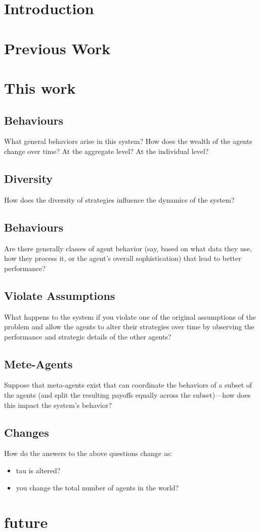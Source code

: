 \documentclass[]{article}
\title{}
\author{}
\begin{document}
\maketitle

\begin{abstract}

\end{abstract}

\section{Introduction}
\cite{Challenge}
\section{Previous Work}
\cite{RePEc:aea:aecrev:v:84:y:1994:i:2:p:406-11}
\cite{PAISE2007}
\cite{PAISE2009}
\section{This work}
\cite{Github}
\subsection{Behaviours}What general behaviors arise in this system?  How does the wealth of the agents change over time? At the aggregate level? At the individual level?
\subsection{Diversity}How does the diversity of strategies influence the dynamics of the system?
\subsection{Behaviours}Are there generally classes of agent behavior (say, based on what data they use, how they process it, or the agent's overall sophistication) that lead to better performance?
\subsection{Violate Assumptions}What happens to the system if you violate one of the original assumptions of the problem and allow the agents to alter their strategies over time by observing the performance and strategic details of the other agents?
\subsection{Mete-Agents}Suppose that meta-agents exist that can coordinate the behaviors of a subset of the agents (and split the resulting payoffs equally across the subset)---how does this impact the system's behavior?
\subsection{Changes}How do the answers to the above questions change as:
\begin{itemize}
	\item tau is altered?
	\item you change the total number of agents in the world?
\end{itemize}

\section{future}

\medskip



\end{document}

